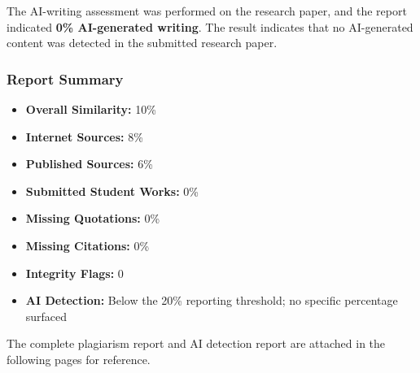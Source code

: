 The AI-writing assessment was performed on the research paper, and the report indicated \textbf{0\% AI-generated writing}. The result indicates that no AI-generated content was detected in the submitted research paper.

\subsubsection*{Report Summary}

\begin{itemize}
    \item \textbf{Overall Similarity:} 10\%
    \item \textbf{Internet Sources:} 8\%
    \item \textbf{Published Sources:} 6\%
    \item \textbf{Submitted Student Works:} 0\%
    \item \textbf{Missing Quotations:} 0\%
    \item \textbf{Missing Citations:} 0\%
    \item \textbf{Integrity Flags:} 0
    \item \textbf{AI Detection:} Below the 20\% reporting threshold; no specific percentage surfaced
\end{itemize}

The complete plagiarism report and AI detection report are attached in the following pages for reference.





